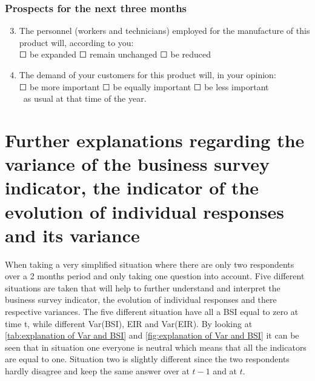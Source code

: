 \documentclass[12pt,a4paper,oneside]{book}
\begin{document}
\subsubsection*{Prospects for the next three months} 
\begin{enumerate}
\setcounter{enumi}{2}
    \item The personnel (workers and technicians) employed for the manufacture of this product will, according to you: \\
    $\Square$ be expanded $\Square$ remain unchanged $\Square$ be reduced
                        
    \item The demand of your customers for this product will, in your opinion:  \\
    $\Square$ be more important $\Square$ be equally important $\Square$ be less important \\\    
    as usual at that time of the year.
\end{enumerate}





\newpage
\section*{Further explanations regarding the variance of the business survey indicator, the indicator of the evolution of individual responses and its variance}
\label{chap:appendix:explain Var BSI and EIR}

When taking a very simplified situation where there are only two respondents over a 2 months period and only taking one question into account. 
Five different situations are taken that will help to further understand and interpret the business survey indicator, the evolution of individual responses and there respective variances.
The five different situation have all a BSI equal to zero at time t, while different Var(BSI), EIR and Var(EIR). 
By looking at \autoref{tab:explanation of Var and BSI} and \autoref{fig:explanation of Var and BSI} it can be seen that in situation one everyone is neutral which means that all the indicators are equal to one.
Situation two is slightly different since the two respondents hardly disagree and keep the same answer over at $t-1$ and at $t$.
\end{document}
